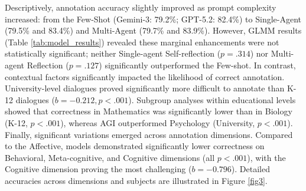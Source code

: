 \documentclass[runningheads]{llncs}
\begin{document}
Descriptively, annotation accuracy slightly improved as prompt complexity increased: from the Few-Shot (Gemini-3: 79.2\%; GPT-5.2: 82.4\%) to Single-Agent (79.5\% and 83.4\%) and Multi-Agent (79.7\% and 83.9\%). However, GLMM results (Table \ref{tab:model_results}) revealed these marginal enhancements were not statistically significant; neither Single-agent Self-reflection ($p = .314$) nor Multi-agent Reflection ($p = .127$) significantly outperformed the Few-shot. In contrast, contextual factors significantly impacted the likelihood of correct annotation. University-level dialogues proved significantly more difficult to annotate than K-12 dialogues ($b = -0.212, p < .001$). Subgroup analyses within educational levels showed that correctness in Mathematics was significantly lower than in Biology (K-12, $p < .001$), whereas AGI outperformed Psychology (University, $p < .001$). Finally, significant variations emerged across annotation dimensions. Compared to the Affective, models demonstrated significantly lower correctness on Behavioral, Meta-cognitive, and Cognitive dimensions (all $p < .001$), with the Cognitive dimension proving the most challenging ($b = -0.796$). Detailed accuracies across dimensions and subjects are illustrated in Figure \ref{fig3}.
\end{document}
